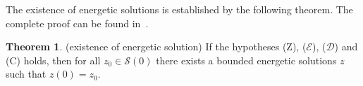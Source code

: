 \documentclass[a4paper,10pt,twoside]{amsbook}
\numberwithin{section}{chapter}
\numberwithin{equation}{chapter}
\theoremstyle{definition}
\newtheorem{thm}[prop]{Theorem}
\DeclareMathOperator{\argmin}{argmin}
\begin{document}
The existence of energetic solutions is established by the following theorem. The complete proof can be found in~\cite{francfort}.
\begin{thm}(existence of energetic solution)
\label{thm:existence-energetic-solutions}
If the hypotheses (Z), ($\mathcal{E}$), ($\mathcal{D}$) and (C) holds, then for all $z_0\in\mathscr{S}(0)$ there exists a bounded energetic solutions $z$ such that $z(0)=z_0$.
\end{thm}
%
%
\end{document}
